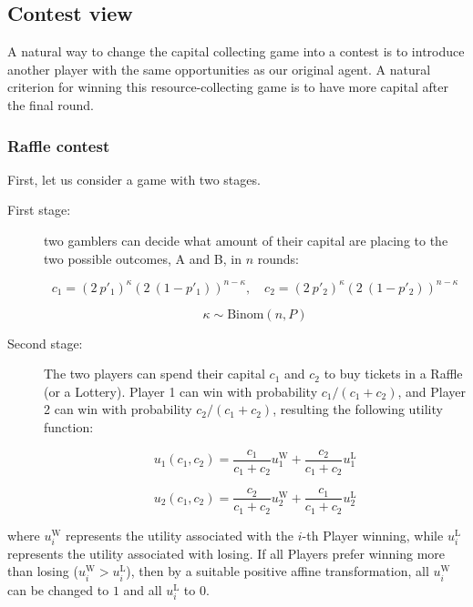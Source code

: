 \documentclass{article}
\theoremstyle{definition}
\begin{document}
\subsection{Contest view}
\label{sec:ContestView}

A natural way to change the capital collecting game into a contest is to introduce another player with the same opportunities as our original agent. A natural criterion for winning this resource-collecting game is to have more capital after the final round.

\subsubsection{Raffle contest}

First, let us consider a game with two stages.
\begin{description}
    \item[First stage:] two gamblers can decide what amount of their capital are placing to the two possible outcomes, A and B, in $n$ rounds:

    \begin{equation}
        c_1 = (2 \ p'_1)^\kappa (2 \ (1-p'_1))^{n-\kappa}, \quad
        c_2 = (2 \ p'_2)^\kappa (2 \ (1-p'_2))^{n-\kappa}
    \end{equation}

    \begin{equation}
        \kappa \sim \mathrm{Binom}(n,P)
    \end{equation}

    \item[Second stage:] The two players can spend their capital $c_1$ and $c_2$ to buy tickets in a Raffle (or a Lottery).
    Player 1 can win with probability $c_1/(c_1+c_2)$, and Player 2 can win with probability $c_2/(c_1+c_2)$, resulting the following utility function:

    \begin{equation}
        u_1(c_1,c_2) = \frac{c_1}{c_1+c_2} u_1^\mathrm{W} + \frac{c_2}{c_1+c_2} u_1^\mathrm{L}
    \end{equation}

    \begin{equation}
        u_2(c_1,c_2) = \frac{c_2}{c_1+c_2} u_2^\mathrm{W} + \frac{c_1}{c_1+c_2} u_2^\mathrm{L}
    \end{equation}
\end{description}

where $u_i^\mathrm{W}$ represents the utility associated with the $i$-th Player winning, while $u_i^\mathrm{L}$ represents the utility associated with losing.
If all Players prefer winning more than losing ($u_i^\mathrm{W}>u_i^\mathrm{L}$), then by a suitable positive affine transformation, all $u_i^\mathrm{W}$ can be changed to $1$ and all $u_i^\mathrm{L}$ to $0$.
\end{document}
